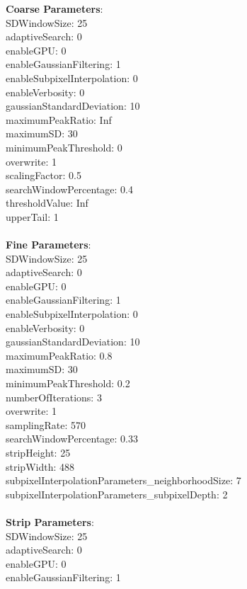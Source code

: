 \documentclass[11pt]{article}
\begin{document}
\textbf{Coarse Parameters}: \\
SDWindowSize: 25\\
adaptiveSearch: 0\\
enableGPU: 0\\
enableGaussianFiltering: 1\\
enableSubpixelInterpolation: 0\\
enableVerbosity: 0\\
gaussianStandardDeviation: 10\\
maximumPeakRatio: Inf\\
maximumSD: 30\\
minimumPeakThreshold: 0\\
overwrite: 1\\
scalingFactor: 0.5\\
searchWindowPercentage: 0.4\\
thresholdValue: Inf\\
upperTail: 1\\
\\
\textbf{Fine Parameters}: \\
SDWindowSize: 25\\
adaptiveSearch: 0\\
enableGPU: 0\\
enableGaussianFiltering: 1\\
enableSubpixelInterpolation: 0\\
enableVerbosity: 0\\
gaussianStandardDeviation: 10\\
maximumPeakRatio: 0.8\\
maximumSD: 30\\
minimumPeakThreshold: 0.2\\
numberOfIterations: 3\\
overwrite: 1\\
samplingRate: 570\\
searchWindowPercentage: 0.33\\
stripHeight: 25\\
stripWidth: 488\\
subpixelInterpolationParameters\_neighborhoodSize: 7\\
subpixelInterpolationParameters\_subpixelDepth: 2\\
\\
\textbf{Strip Parameters}: \\
SDWindowSize: 25\\
adaptiveSearch: 0\\
enableGPU: 0\\
enableGaussianFiltering: 1\\
\end{document}
